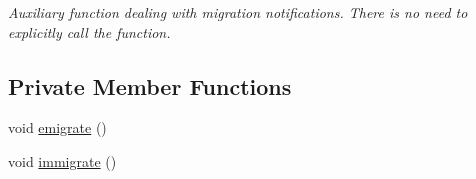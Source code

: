 \begin{CompactItemize}
\begin{CompactList}\small\item\em Auxiliary function dealing with migration notifications. There is no need to explicitly call the function. \item\end{CompactList}\end{CompactItemize}
\subsection*{Private Member Functions}
\begin{CompactItemize}
\item 
\hypertarget{classpeoSyncIslandMig_4c8416e3acce1a6e4c3b0a442d94b063}{
void \hyperlink{classpeoSyncIslandMig_4c8416e3acce1a6e4c3b0a442d94b063}{emigrate} ()}
\label{classpeoSyncIslandMig_4c8416e3acce1a6e4c3b0a442d94b063}

\item 
\hypertarget{classpeoSyncIslandMig_38dd72312a3d16808af1aa7beb9ed4a7}{
void \hyperlink{classpeoSyncIslandMig_38dd72312a3d16808af1aa7beb9ed4a7}{immigrate} ()}
\label{classpeoSyncIslandMig_38dd72312a3d16808af1aa7beb9ed4a7}

\end{CompactItemize}
